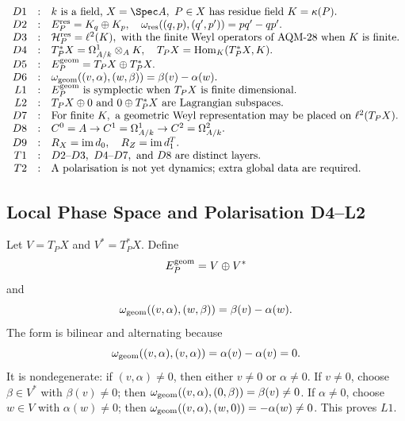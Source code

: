 \[
\begin{array}{rcl}
D1&:&k\text{ is a field, }X=\Spec A,\ P\in X\text{ has residue field }
      K=\kappa(P).\\
D2&:&E_P^{\rm res}=K_q\oplus K_p,\quad
      \omega_{\rm res}((q,p),(q',p'))=pq'-qp'.\\
D3&:&\mathcal H_P^{\rm res}=\ell^2(K),\text{ with the finite Weyl operators
      of AQM-28 when }K\text{ is finite}.\\
D4&:&T_P^*X=\Omega^1_{A/k}\otimes_A K,\quad
      T_PX=\operatorname{Hom}_K(T_P^*X,K).\\
D5&:&E_P^{\rm geom}=T_PX\oplus T_P^*X.\\
D6&:&\omega_{\rm geom}((v,\alpha),(w,\beta))=\beta(v)-\alpha(w).\\
L1&:&E_P^{\rm geom}\text{ is symplectic when }T_PX\text{ is finite
      dimensional}.\\
L2&:&T_PX\oplus0\text{ and }0\oplus T_P^*X\text{ are Lagrangian subspaces}.\\
D7&:&\text{For finite }K,\text{ a geometric Weyl representation may be placed
      on }\ell^2(T_PX).\\
D8&:&C^0=A\to C^1=\Omega^1_{A/k}\to C^2=\Omega^2_{A/k}.\\
D9&:&R_X=\operatorname{im}d_0,\quad R_Z=\operatorname{im}d_1^T.\\
T1&:&D2\text{--}D3,\ D4\text{--}D7,\text{ and }D8\text{ are distinct layers}.\\
T2&:&\text{A polarisation is not yet dynamics; extra global data are required.}
\end{array}
\]

\subsection{Local Phase Space and Polarisation D4--L2}

Let \(V=T_PX\) and \(V^*=T_P^*X\).  Define
\[
  E_P^{\rm geom}=V\oplus V^*
\]
and
\[
  \omega_{\rm geom}((v,\alpha),(w,\beta))=\beta(v)-\alpha(w).
\]
The form is bilinear and alternating because
\[
  \omega_{\rm geom}((v,\alpha),(v,\alpha))=\alpha(v)-\alpha(v)=0.
\]
It is nondegenerate: if \((v,\alpha)\ne0\), then either \(v\ne0\) or
\(\alpha\ne0\).  If \(v\ne0\), choose \(\beta\in V^*\) with \(\beta(v)\ne0\);
then \(\omega_{\rm geom}((v,\alpha),(0,\beta))=\beta(v)\ne0\).  If
\(\alpha\ne0\), choose \(w\in V\) with \(\alpha(w)\ne0\); then
\(\omega_{\rm geom}((v,\alpha),(w,0))=-\alpha(w)\ne0\).  This proves \(L1\).

